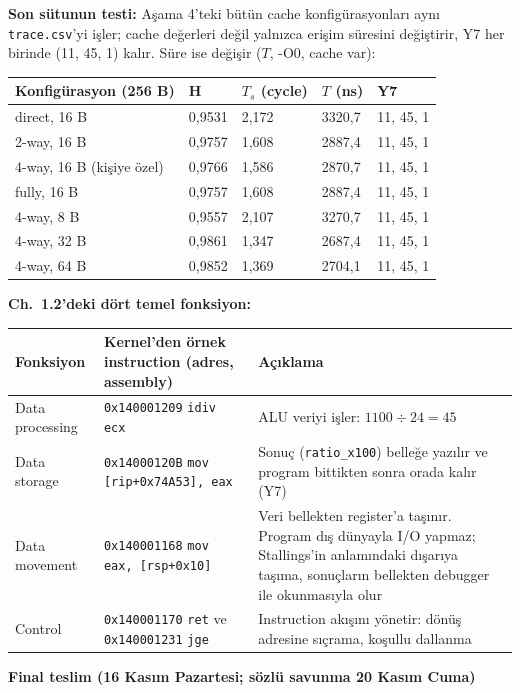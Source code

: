 \documentclass[11pt,a4paper]{article}
\newcommand{\tl}{\texttt}
\newcommand{\hd}[1]{\cellcolor{hdr}#1}
\begin{document}
\textbf{Son sütunun testi:} Aşama 4'teki bütün cache konfigürasyonları aynı \tl{trace.csv}'yi
işler; cache değerleri değil yalnızca erişim süresini değiştirir, Y7 her birinde (11, 45, 1)
kalır. Süre ise değişir ($T$, -O0, cache var):

\begin{longtable}{|p{5.0cm}|p{2.0cm}|p{2.6cm}|p{2.6cm}|p{3.3cm}|}
\hline
\hd{Konfigürasyon (256 B)} & \hd{H} & \hd{$T_s$ (cycle)} & \hd{$T$ (ns)} & \hd{Y7}\\
\hline
direct, 16 B & 0,9531 & 2,172 & 3320,7 & 11, 45, 1\\ \hline
2-way, 16 B & 0,9757 & 1,608 & 2887,4 & 11, 45, 1\\ \hline
4-way, 16 B (kişiye özel) & 0,9766 & 1,586 & 2870,7 & 11, 45, 1\\ \hline
fully, 16 B & 0,9757 & 1,608 & 2887,4 & 11, 45, 1\\ \hline
4-way, 8 B & 0,9557 & 2,107 & 3270,7 & 11, 45, 1\\ \hline
4-way, 32 B & 0,9861 & 1,347 & 2687,4 & 11, 45, 1\\ \hline
4-way, 64 B & 0,9852 & 1,369 & 2704,1 & 11, 45, 1\\ \hline
\end{longtable}

\textbf{Ch.~1.2'deki dört temel fonksiyon:}

\begin{longtable}{|p{2.8cm}|p{5.2cm}|p{7.5cm}|}
\hline
\hd{Fonksiyon} & \hd{Kernel'den örnek instruction (adres, assembly)} & \hd{Açıklama}\\
\hline
Data processing & \tl{0x140001209} \tl{idiv ecx} & ALU veriyi işler: $1100 \div 24 = 45$\\ \hline
Data storage & \tl{0x14000120B} \tl{mov [rip+0x74A53], eax} & Sonuç (\tl{ratio\_x100}) belleğe yazılır ve program bittikten sonra orada kalır (Y7)\\ \hline
Data movement & \tl{0x140001168} \tl{mov eax, [rsp+0x10]} & Veri bellekten register'a taşınır. Program dış dünyayla I/O yapmaz; Stallings'in anlamındaki dışarıya taşıma, sonuçların bellekten debugger ile okunmasıyla olur\\ \hline
Control & \tl{0x140001170} \tl{ret} ve \tl{0x140001231} \tl{jge} & Instruction akışını yönetir: dönüş adresine sıçrama, koşullu dallanma\\ \hline
\end{longtable}

\textbf{Final teslim (16 Kasım Pazartesi; sözlü savunma 20 Kasım Cuma)}
\end{document}
